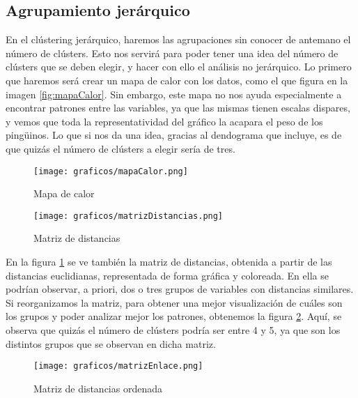 \documentclass[a4paper,onecolumn]{extarticle}
\begin{document}
\begin{sloppypar}
\subsection{Agrupamiento jerárquico} \label{jerarquico}
En el clústering jerárquico, haremos las agrupaciones sin conocer de antemano el número de clústers. Esto nos servirá para poder tener una idea del número de 
clústers que se deben elegir, y hacer con ello el análisis no jerárquico. Lo primero que haremos será crear un mapa de calor con los datos, como el que figura 
en la imagen \ref{fig:mapaCalor}. Sin embargo, este mapa no nos ayuda especialmente a encontrar patrones entre las variables, ya que las mismas tienen escalas 
dispares, y vemos que toda la representatividad del gráfico la acapara el peso de los pingüinos. Lo que si nos da una idea, gracias al dendograma que incluye, 
es de que quizás el número de clústers a elegir sería de tres.
\begin{center}
    \begin{figure}[h!]
        \centering
        \begin{minipage}{0.5\textwidth}
            \centering
            \texttt{[image: graficos/mapaCalor.png]}
            \caption{\small{Mapa de calor}}
            \label{fig:mapaCalor}
        \end{minipage}
        \hspace{0.005\textwidth} %
        \begin{minipage}{0.45\textwidth}
            \centering
            \texttt{[image: graficos/matrizDistancias.png]}
            \caption{\small{Matriz de distancias}}
            \label{fig:matrizDistancias}
        \end{minipage}
    \end{figure}
\end{center}

En la figura \ref{fig:matrizDistancias} se ve también la matriz de distancias, obtenida a partir de las distancias euclidianas, representada de forma gráfica 
y coloreada. En ella se podrían observar, a priori, dos o tres grupos de variables con distancias similares. Si reorganizamos la matriz, para obtener una 
mejor visualización de cuáles son los grupos y poder analizar mejor los patrones, obtenemos la figura \ref{fig:matrizEnlace}. Aquí, se observa que quizás 
el número de clústers podría ser entre 4 y 5, ya que son los distintos grupos que se observan en dicha matriz.
\begin{center}
    \begin{figure}[h!]
        \centering
        \texttt{[image: graficos/matrizEnlace.png]}
        \caption{Matriz de distancias ordenada}
        \label{fig:matrizEnlace}
    \end{figure}
\end{center}


\end{sloppypar}
\end{document}
